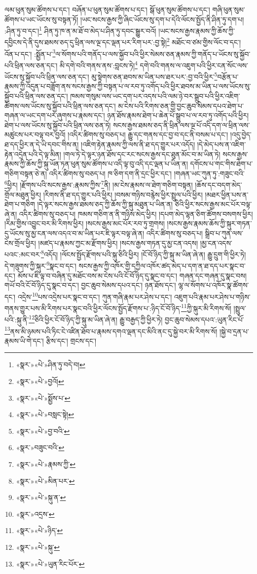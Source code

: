 ལམ་ཕུན་སུམ་ཚོགས་པ་དང་། བཞོན་པ་ཕུན་སུམ་ཚོགས་པ་དང་། སྒོ་ཕུན་སུམ་ཚོགས་པ་དང་། གཞི་ཕུན་སུམ་ཚོགས་པ་ཡང་ཡོངས་སུ་བསྟན་ཏོ། །ཡང་སངས་རྒྱས་ཀྱི་ཞིང་ཡོངས་སུ་དག་པ་དེའི་ལོངས་སྤྱོད་ནི་ཤིན་ཏུ་དག་པ། :ཤིན་ཏུ་བ་དང་།\footnote{«སྣར་»«པེ་»ཤིན་ཏུ་བདེ་བ།} ཤིན་ཏུ་ཁ་ན་མ་ཐོ་བ་མེད་པ་ཤིན་ཏུ་དབང་སྒྱུར་བའོ། །ཡང་སངས་རྒྱས་རྣམས་ཀྱི་ཆོས་ཀྱི་དབྱིངས་དེ་ནི་དུས་ཐམས་ཅད་དུ་ཕྲིན་ལས་ལྔ་དང་ལྡན་པར་རིག་པར་:བྱ་སྟེ།\footnote{«སྣར་»«པེ་»བྱའོ།} མཐོང་བ་ཙམ་གྱིས་ལོང་བ་དང་། འོན་པ་དང་། :སྨྱོན་པ་\footnote{«སྣར་»«པེ་»སྨྱོས་པ་}ལ་སོགས་པའི་གནོད་པ་ལས་སྐྱོབ་པའི་ཕྱིར་སེམས་ཅན་རྣམས་ཀྱི་གནོད་པ་ཡོངས་སུ་སྐྱོབ་པའི་ཕྲིན་ལས་ཅན་དང་། མི་དགེ་བའི་གནས་ནས་:བླངས་ཏེ།\footnote{«སྣར་»«པེ་»བསླང་སྟེ།} དགེ་བའི་གནས་ལ་འཇུག་པའི་ཕྱིར་ངན་སོང་ལས་ཡོངས་སུ་སྐྱོབ་པའི་ཕྲིན་ལས་ཅན་དང་། མུ་སྟེགས་ཅན་ཐབས་མ་ཡིན་པས་ཐར་པར་:བྱ་བའི་ཕྱིར་\footnote{«སྣར་»«པེ་»བྱ་བའི་}བརྩོན་པ་རྣམས་ཀྱི་འདུན་པ་བཟློག་ནས་སངས་རྒྱས་ཀྱི་བསྟན་པ་ལ་རབ་ཏུ་འགོད་པའི་ཕྱིར་ཐབས་མ་ཡིན་པ་ལས་ཡོངས་སུ་སྐྱོབ་པའི་ཕྲིན་ལས་ཅན་དང་། ཁམས་གསུམ་ལས་ཡང་དག་པར་འདས་པའི་ལམ་ཉེ་བར་སྒྲུབ་པའི་ཕྱིར་འཇིག་ཚོགས་ལས་ཡོངས་སུ་སྐྱོབ་པའི་ཕྲིན་ལས་ཅན་དང་། མ་ངེས་པའི་རིགས་ཅན་གྱི་བྱང་ཆུབ་སེམས་དཔའ་ཐེག་པ་གཞན་ལ་ཡང་དག་པར་ཞུགས་པ་རྣམས་དང་། ཉན་ཐོས་རྣམས་ཐེག་པ་ཆེན་པོ་སྒྲུབ་པ་ལ་རབ་ཏུ་འགོད་པའི་ཕྱིར། ཐེག་པ་ལས་ཡོངས་སུ་སྐྱོབ་པའི་ཕྲིན་ལས་ཅན་ཏེ། སངས་རྒྱས་ཐམས་ཅད་ནི་ཕྲིན་ལས་ལྔ་པོ་འདི་དག་ལ་ཕྲིན་ལས་མཚུངས་པར་བལྟ་བར་བྱའོ། །འདིར་ཚིགས་སུ་བཅད་པ། རྒྱུ་དང་གནས་དང་བྱ་བ་དང་ནི་བསམ་པ་དང་། །འདུ་བྱེད་ཐ་དད་ཕྱིར་ན་དེ་ཡི་དབང་གིས་ན། །འཇིག་རྟེན་རྣམས་ཀྱི་ལས་ནི་ཐ་དད་གྱུར་པར་འདོད། །དེ་མེད་པས་ན་འཇིག་རྟེན་འདྲེན་པའི་དེ་ལྟ་མིན། །གལ་ཏེ་དེ་ལྟར་ཉན་ཐོས་དང་རང་སངས་རྒྱས་དང་ཐུན་མོང་བ་མ་ཡིན་ཏེ། སངས་རྒྱས་རྣམས་ཀྱི་ཆོས་ཀྱི་སྐུ་ཡོན་ཏན་ཕུན་སུམ་ཚོགས་པ་འདི་ལྟ་བུ་འདི་དང་ལྡན་པ་ཡིན་ན། དགོངས་པ་གང་གིས་ཐེག་པ་གཅིག་བསྟན་ཅེ་ན། འདིར་ཚིགས་སུ་བཅད་པ། ཁ་ཅིག་དག་ནི་དྲང་ཕྱིར་དང་། །གཞན་ཡང་ཀུན་ཏུ་:གཟུང་བའི་\footnote{«སྣར་»བཟུང་བའི་}ཕྱིར། །རྫོགས་པའི་སངས་རྒྱས་:རྣམས་ཀྱིས་\footnote{«སྣར་»«པེ་»རྣམས་ཀྱི་}ནི། །མ་ངེས་རྣམས་ལ་ཐེག་གཅིག་བསྟན། །ཆོས་དང་བདག་མེད་གྲོལ་མཐུན་ཕྱིར། །རིགས་ནི་ཐ་དད་གྱུར་པའི་ཕྱིར། །བསམ་གཉིས་བརྙེས་ཕྱིར་སྤྲུལ་པའི་ཕྱིར། །མཐར་ཕྱིན་པས་ན་ཐེག་པ་གཅིག །དེ་ལྟར་སངས་རྒྱས་ཐམས་ཅད་ཀྱི་ཆོས་ཀྱི་སྐུ་མཐུན་པ་ཡིན་ན། ཅིའི་ཕྱིར་སངས་རྒྱས་མང་པོར་བལྟ་ཞེ་ན། འདིར་ཚིགས་སུ་བཅད་པ། ཁམས་གཅིག་ན་ནི་གཉིས་མེད་ཕྱིར། །དཔག་མེད་ལྷན་ཅིག་ཚོགས་བསགས་ཕྱིར། །རིམ་གྱིས་འབྱུང་བར་མི་རིགས་ཕྱིར། །སངས་རྒྱས་མང་པོར་རབ་ཏུ་གྲགས། །སངས་རྒྱས་རྣམས་ཆོས་ཀྱི་སྐུར་གཏན་དུ་ཡོངས་སུ་མྱ་ངན་ལས་འདའ་བ་མ་ཡིན་པར་ཇི་ལྟར་བལྟ་ཞེ་ན། འདིར་ཚིགས་སུ་བཅད་པ། སྒྲིབ་པ་ཀུན་ལས་ངེས་གྲོལ་ཕྱིར། །མཛད་པ་རྣམས་ཀྱང་མ་རྫོགས་ཕྱིར། །སངས་རྒྱས་གཏན་དུ་མྱ་ངན་འདས། །མྱ་ངན་འདས་པའང་:མང་བར་\footnote{«སྣར་»«པེ་»མིན་པར་}འདོད། །ལོངས་སྤྱོད་རྫོགས་པའི་སྐུ་ཅིའི་ཕྱིར། །ངོ་བོ་ཉིད་ཀྱི་སྐུ་མ་ཡིན་ཞེ་ན། རྒྱུ་དྲུག་གི་ཕྱིར་ཏེ། དེ་གཟུགས་ཀྱི་སྐུར་\footnote{«སྣར་»«པེ་»སྐུ་ན་}སྣང་བ་དང་། སངས་རྒྱས་ཀྱི་འཁོར་གྱི་དཀྱིལ་འཁོར་ཚད་མེད་པ་དག་ན་ཐ་དད་པར་སྣང་བ་དང་། མོས་པ་ཇི་ལྟ་བ་བཞིན་དུ་མཐོང་བས་མ་ངེས་པའི་ངོ་བོ་ཉིད་དུ་སྣང་བ་དང་། གཞན་དང་གཞན་དུ་སྣང་བས། གཡོ་བའི་ངོ་བོ་ཉིད་དུ་སྣང་བ་དང་། བྱང་ཆུབ་སེམས་དཔའ་དང་། ཉན་ཐོས་དང་། ལྷ་ལ་སོགས་པ་འཁོར་སྣ་ཚོགས་དང་། འདྲེས་\footnote{«སྣར་»འདྲས་}པས་འདྲེས་པར་སྣང་བ་དང་། ཀུན་གཞི་རྣམ་པར་ཤེས་པ་དང་། འཇུག་པའི་རྣམ་པར་ཤེས་པ་གཉིས་གནས་གྱུར་པས་མི་རིགས་པར་སྣང་བའི་ཕྱིར་ལོངས་སྤྱོད་རྫོགས་པ་:ཉིད་ངོ་བོ་ཉིད་\footnote{«སྣར་»«པེ་»ཉིད་}ཀྱི་སྐུར་མི་རིགས་སོ། །སྤྲུལ་པའི་:སྐུ་ནི་\footnote{«སྣར་»«པེ་»སྐུ་}ཅིའི་ཕྱིར་ངོ་བོ་ཉིད་ཀྱི་སྐུ་མ་ཡིན་ཞེ་ན། རྒྱུ་བརྒྱད་ཀྱི་ཕྱིར་ཏེ། བྱང་ཆུབ་སེམས་དཔའ་:ཡུན་རིང་པོ་\footnote{«སྣར་»«པེ་»ཡུན་རིང་པོར་}ནས་མི་ཉམས་པའི་ཏིང་ངེ་འཛིན་ཐོབ་པ་རྣམས་དགའ་ལྡན་དང་མིའི་ནང་དུ་སྐྱེ་བར་མི་རིགས་སོ། །སྐྱེ་བ་དྲན་པ་རྣམས་ཡི་གེ་དང་། རྩིས་དང་། གྲངས་དང་། 